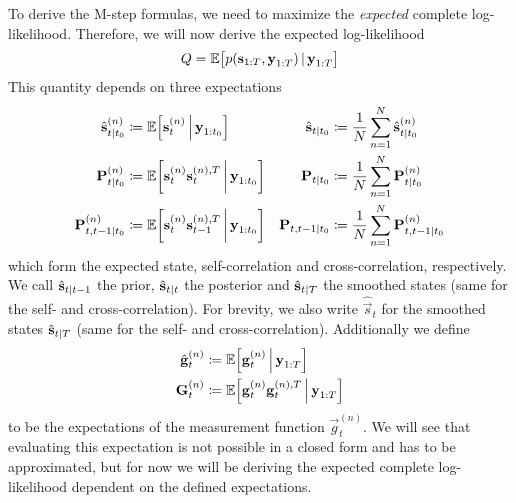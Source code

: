 	To derive the M-step formulas, we need to maximize the \emph{expected} complete log-likelihood. Therefore, we will now derive the expected log-likelihood
	\begin{equation*}
		Q = \mathbb{E}\big[ p(\boldsymbol{\mathrm{s}}_{1:T}, \boldsymbol{\mathrm{y}}_{1:T}) \,\vert\, \boldsymbol{\mathrm{y}}_{1:T} \big]
	\end{equation*}
	This quantity depends on three expectations
	\begin{align*}
		\hat{\boldsymbol{\mathrm{s}}}_{t \vert t_0}^{(n)}  &\coloneqq \mathbb{E}\Big[\boldsymbol{\mathrm{s}}_t^{(n)} \,\Big\vert\, \boldsymbol{\mathrm{y}}_{1:t_0}\Big]
			& \hat{\boldsymbol{\mathrm{s}}}_{t \vert t_0}           &\coloneqq \frac{1}{N} \sum_{n = 1}^{N} \hat{\boldsymbol{\mathrm{s}}}_{t \vert t_0}^{(n)} \\
		\boldsymbol{\mathrm{P}}_{t \vert t_0}^{(n)}        &\coloneqq \mathbb{E}\bigg[\boldsymbol{\mathrm{s}}_t^{(n)} \boldsymbol{\mathrm{s}}_t^{(n), T} \,\bigg\vert\, \boldsymbol{\mathrm{y}}_{1:t_0}\bigg]
			& \boldsymbol{\mathrm{P}}_{t \vert t_0}        &\coloneqq \frac{1}{N} \sum_{n = 1}^{N} \boldsymbol{\mathrm{P}}_{t \vert t_0}^{(n)} \\
		\boldsymbol{\mathrm{P}}_{t, t - 1 \vert t_0}^{(n)} &\coloneqq \mathbb{E}\bigg[\boldsymbol{\mathrm{s}}_t^{(n)} \boldsymbol{\mathrm{s}}_{t - 1}^{(n), T} \,\bigg\vert\, \boldsymbol{\mathrm{y}}_{1:t_0}\bigg]
			& \boldsymbol{\mathrm{P}}_{t, t - 1 \vert t_0} &\coloneqq \frac{1}{N} \sum_{n = 1}^{N} \boldsymbol{\mathrm{P}}_{t, t - 1 \vert t_0}^{(n)}
	\end{align*}
	which form the expected state, self-correlation and cross-correlation, respectively. We call \( \hat{\boldsymbol{\mathrm{s}}}_{t \vert t - 1} \) the prior, \( \hat{\boldsymbol{\mathrm{s}}}_{t \vert t} \) the posterior and \( \hat{\boldsymbol{\mathrm{s}}}_{t \vert T} \) the smoothed states (same for the self- and cross-correlation). For brevity, we also write \( \hat{\vec{s}}_t \) for the smoothed states \( \hat{\boldsymbol{\mathrm{s}}}_{t \vert T} \) (same for the self- and cross-correlation). Additionally we define
	\begin{align}
		\hat{\boldsymbol{\mathrm{g}}}_t^{(n)} &\coloneqq \mathbb{E}\Big[\boldsymbol{\mathrm{g}}_t^{(n)} \,\Big\vert\, \boldsymbol{\mathrm{y}}_{1:T}\Big]  \label{eq:expectedMeasurement} \\
		\boldsymbol{\mathrm{G}}_t^{(n)}       &\coloneqq \mathbb{E}\Big[\boldsymbol{\mathrm{g}}_t^{(n)} \boldsymbol{\mathrm{g}}_t^{(n), T} \,\Big\vert\, \boldsymbol{\mathrm{y}}_{1:T}\Big]  \label{eq:expectedMeasurementMat}
	\end{align}
	to be the expectations of the measurement function \( \vec{g}_t^{(n)} \). We will see that evaluating this expectation is not possible in a closed form and has to be approximated, but for now we will be deriving the expected complete log-likelihood dependent on the defined expectations.

